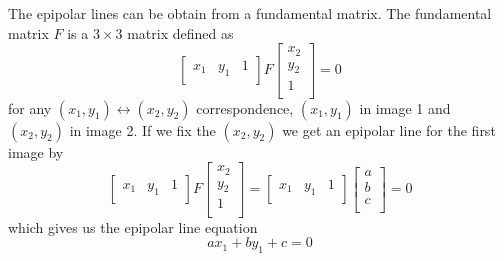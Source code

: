 The epipolar lines can be obtain from a fundamental matrix. The fundamental matrix $F$ is a $3 \times 3$ matrix defined as
\begin{equation}
	\begin{bmatrix}
		x_1 & y_1 & 1 \\
	\end{bmatrix}
	F
	\begin{bmatrix}
		x_2 \\
		y_2 \\
		1 \\
	\end{bmatrix}
	= 0
	\label{eq:fundamental-matrix}
\end{equation}
for any $(x_1, y_1) \leftrightarrow (x_2, y_2)$ correspondence, $(x_1, y_1)$ in image 1 and $(x_2, y_2)$ in image 2. If we fix the $(x_2, y_2)$ we get an epipolar line for the first image by
\begin{equation}
	\begin{bmatrix}
		x_1 & y_1 & 1 \\
	\end{bmatrix}
	F
	\begin{bmatrix}
		x_2 \\
		y_2 \\
		1 \\
	\end{bmatrix}
	=
	\begin{bmatrix}
		x_1 & y_1 & 1 \\
	\end{bmatrix}
	\begin{bmatrix}
		a \\
		b \\
		c \\
	\end{bmatrix}
	= 0
\end{equation}
which gives us the epipolar line equation
\begin{equation}
	ax_1 + by_1 + c = 0
\end{equation}


